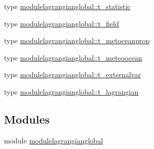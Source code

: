 \begin{DoxyCompactItemize}
\item 
type \mbox{\hyperlink{structmodulelagrangianglobal_1_1t__statistic}{modulelagrangianglobal\+::t\+\_\+statistic}}
\item 
type \mbox{\hyperlink{structmodulelagrangianglobal_1_1t__field}{modulelagrangianglobal\+::t\+\_\+field}}
\item 
type \mbox{\hyperlink{structmodulelagrangianglobal_1_1t__metoceanprop}{modulelagrangianglobal\+::t\+\_\+metoceanprop}}
\item 
type \mbox{\hyperlink{structmodulelagrangianglobal_1_1t__meteoocean}{modulelagrangianglobal\+::t\+\_\+meteoocean}}
\item 
type \mbox{\hyperlink{structmodulelagrangianglobal_1_1t__externalvar}{modulelagrangianglobal\+::t\+\_\+externalvar}}
\item 
type \mbox{\hyperlink{structmodulelagrangianglobal_1_1t__lagrangian}{modulelagrangianglobal\+::t\+\_\+lagrangian}}
\end{DoxyCompactItemize}
\subsection*{Modules}
\begin{DoxyCompactItemize}
\item 
module \mbox{\hyperlink{namespacemodulelagrangianglobal}{modulelagrangianglobal}}
\end{DoxyCompactItemize}

